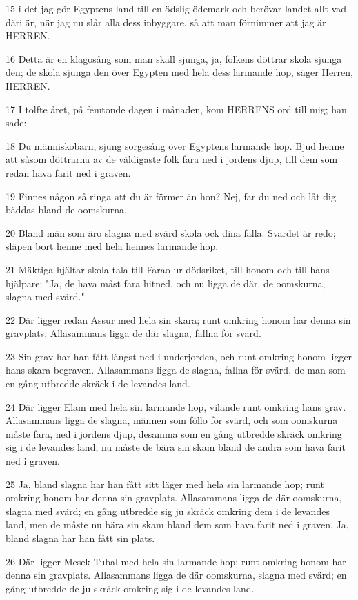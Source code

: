 \par 15 i det jag gör Egyptens land till en ödslig ödemark och berövar landet allt vad däri är, när jag nu slår alla dess inbyggare, så att man förnimmer att jag är HERREN.
\par 16 Detta är en klagosång som man skall sjunga, ja, folkens döttrar skola sjunga den; de skola sjunga den över Egypten med hela dess larmande hop, säger Herren, HERREN.
\par 17 I tolfte året, på femtonde dagen i månaden, kom HERRENS ord till mig; han sade:
\par 18 Du människobarn, sjung sorgesång över Egyptens larmande hop. Bjud henne att såsom döttrarna av de väldigaste folk fara ned i jordens djup, till dem som redan hava farit ned i graven.
\par 19 Finnes någon så ringa att du är förmer än hon? Nej, far du ned och låt dig bäddas bland de oomskurna.
\par 20 Bland män som äro slagna med svärd skola ock dina falla. Svärdet är redo; släpen bort henne med hela hennes larmande hop.
\par 21 Mäktiga hjältar skola tala till Farao ur dödsriket, till honom och till hans hjälpare: "Ja, de hava måst fara hitned, och nu ligga de där, de oomskurna, slagna med svärd.".
\par 22 Där ligger redan Assur med hela sin skara; runt omkring honom har denna sin gravplats. Allasammans ligga de där slagna, fallna för svärd.
\par 23 Sin grav har han fått längst ned i underjorden, och runt omkring honom ligger hans skara begraven. Allasammans ligga de slagna, fallna för svärd, de man som en gång utbredde skräck i de levandes land.
\par 24 Där ligger Elam med hela sin larmande hop, vilande runt omkring hans grav. Allasammans ligga de slagna, männen som föllo för svärd, och som oomskurna måste fara, ned i jordens djup, desamma som en gång utbredde skräck omkring sig i de levandes land; nu måste de bära sin skam bland de andra som hava farit ned i graven.
\par 25 Ja, bland slagna har han fått sitt läger med hela sin larmande hop; runt omkring honom har denna sin gravplats. Allasammans ligga de där oomskurna, slagna med svärd; en gång utbredde sig ju skräck omkring dem i de levandes land, men de måste nu bära sin skam bland dem som hava farit ned i graven. Ja, bland slagna har han fått sin plats.
\par 26 Där ligger Mesek-Tubal med hela sin larmande hop; runt omkring honom har denna sin gravplats. Allasammans ligga de där oomskurna, slagna med svärd; en gång utbredde de ju skräck omkring sig i de levandes land.
